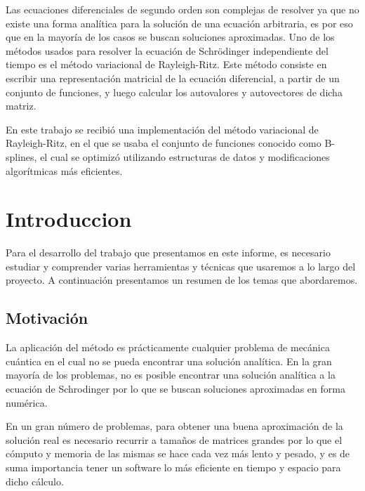 \documentclass[a4paper,openright,12pt, oneside]{book}
\begin{document}
Las ecuaciones diferenciales de segundo orden son complejas de resolver ya que no existe una forma anal\'itica para la soluci\'on de una ecuaci\'on arbitraria, es por eso que en la mayor\'ia de los casos se buscan soluciones aproximadas. Uno de los m\'etodos usados para resolver la ecuaci\'on de Schr\"odinger independiente del tiempo es el m\'etodo variacional de Rayleigh-Ritz. Este m\'etodo consiste en escribir una representaci\'on matricial de la ecuaci\'on diferencial, a partir de un conjunto de funciones, y luego calcular los autovalores y autovectores de dicha matriz.

En este trabajo se recibi\'o una implementaci\'on del m\'etodo variacional de Rayleigh-Ritz, en el que se usaba el conjunto de funciones conocido como B-splines, el cual se optimiz\'o utilizando estructuras de datos y modificaciones algor\'itmicas m\'as eficientes.


\tableofcontents %

\setcounter{chapter}{1}
\chapter*{Introduccion}\label{Introduccion}
\markboth{}{} %

Para el desarrollo del trabajo que presentamos en este informe, es necesario estudiar y comprender varias herramientas y t\'ecnicas que usaremos a lo largo del proyecto. A continuaci\'on presentamos un resumen de los temas que abordaremos.

\section{Motivaci\'on}

La aplicaci\'on del m\'etodo es pr\'acticamente cualquier problema de mec\'anica cu\'antica en el 
cual no se pueda encontrar una soluci\'on anal\'itica.
En la gran mayor\'ia de los problemas, no es posible encontrar una soluci\'on anal\'itica a la ecuaci\'on de Schrodinger por lo que se buscan soluciones aproximadas en forma num\'erica.

En un gran n\'umero de problemas, para obtener una buena aproximaci\'on de la soluci\'on real es necesario recurrir a tama\~nos de matrices grandes por lo que el c\'omputo y memoria de las mismas se hace cada vez m\'as lento y pesado, y es de suma importancia tener un software lo m\'as eficiente en tiempo y espacio para dicho c\'alculo. 
\end{document}
